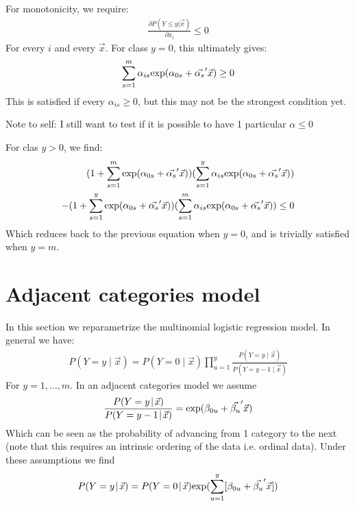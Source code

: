 \documentclass[12pt]{article}
\begin{document}
For monotonicity, we require:
\begin{align*}
	\frac{\partial P(Y \leq y | \vec{x})}{\partial x_i} \leq 0
\end{align*}
For every $i$ and every $\vec{x}$. For class $y = 0$, this ultimately gives:
\begin{align*}
	\sum_{s = 1}^{m} \alpha_{is} \textup{exp} (\alpha_{0s} + \vec{\alpha_{s}}' \vec{x}) \geq 0
\end{align*}
This is satisfied if every $\alpha_{is} \geq 0$, but this may not be the strongest condition yet.

Note to self: I still want to test if it is possible to have 1 particular $\alpha \leq 0$

For clas $y > 0$, we find:
\begin{align*}
	(1 + \sum_{s = 1}^{m} \textup{exp} (\alpha_{0s} + \vec{\alpha_{s}}' \vec{x}))(\sum_{s = 1}^{y} \alpha_{is} \textup{exp} (\alpha_{0s} + \vec{\alpha_{s}}' \vec{x})) \\
	- (1 + \sum_{s = 1}^{y} \textup{exp} (\alpha_{0s} + \vec{\alpha_{s}}' \vec{x}))(\sum_{s = 1}^{m} \alpha_{is} \textup{exp} (\alpha_{0s} + \vec{\alpha_{s}}' \vec{x})) \leq 0
\end{align*}
Which reduces back to the previous equation when $y = 0$, and is trivially satisfied when $y = m$. 


\section{Adjacent categories model}
In this section we reparametrize the multinomial logistic regression model. In general we have:
\begin{align*}
	P(Y=y\!\mid\!\vec{x}) = P(Y=0\!\mid\!\vec{x}) \prod_{u = 1}^{y} \frac{P(Y=y\!\mid\!\vec{x})}{P(Y=y-1\!\mid\!\vec{x})}
\end{align*}
For $y = 1,\ldots,m$. In an adjacent categories model we assume
\begin{align*}
	\frac{P(Y=y\!\mid\!\vec{x})}{P(Y=y-1\!\mid\!\vec{x})} = \textup{exp}(\beta_{0u} + \vec{\beta_{u}}'\vec{x})
\end{align*}
Which can be seen as the probability of advancing from 1 category to the next (note that this requires an intrinsic ordering of the data i.e. ordinal data). Under these assumptions we find
\begin{align*}
	P(Y=y\!\mid\!\vec{x}) = P(Y=0\!\mid\!\vec{x}) \textup{exp}(\sum_{u = 1}^{y}[\beta_{0u} + \vec{\beta_{u}}'\vec{x}])
\end{align*}
\end{document}

